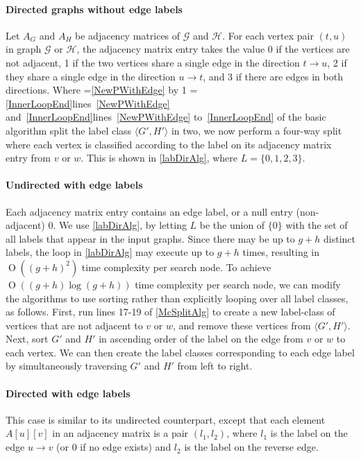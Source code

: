 \documentclass[letterpaper]{article}
\newcommand{\graphG}{\mathcal{G}}
\newcommand{\graphH}{\mathcal{H}}
\newcommand{\setG}{G}
\newcommand{\setH}{H}
\newcommand{\linerangeref}[2]{\count255=\ref{#1}\advance\count255 by 1 \ifnum\count255=\ref{#2}lines~\ref{#1} and~\ref{#2}\else lines~\ref{#1} to~\ref{#2}\fi}
\newcommand{\BigO}[1]{\ensuremath{\operatorname{O}\left(#1\right)}}
\begin{document}
\paragraph{Directed graphs without edge labels} Let $A_G$ and $A_H$ be
adjacency matrices of $\graphG$ and $\graphH$. For each vertex pair $(t,u)$ in graph $\graphG$ or
$\graphH$, the adjacency matrix entry takes the value 0 if the vertices are not
adjacent, 1 if the two vertices share a single edge in the direction $t
\rightarrow u$, 2 if they share a single edge in the direction $u \rightarrow
t$, and 3 if there are edges in both directions. Where
\linerangeref{NewPWithEdge}{InnerLoopEnd} of the basic algorithm split the
label class $\langle \setG',\setH' \rangle$ in two, we now perform a four-way split
where each vertex is classified according to the label on its adjacency matrix
entry from $v$ or $w$.  This is shown in \cref{labDirAlg}, where
$L=\{0,1,2,3\}$.

\paragraph{Undirected with edge labels} Each adjacency matrix entry contains an
edge label, or a null entry (non-adjacent) $0$.  We use \cref{labDirAlg}, by
letting $L$ be the union of $\{0\}$ with the set of all labels that appear in
the input graphs. Since there may be up to $g + h$ distinct labels, the loop in
\cref{labDirAlg} may execute up to $g + h$ times, resulting in $\BigO{(g+h)^2}$
time complexity per search node.  To achieve $\BigO{(g+h) \log (g+h)}$ time
complexity per search node, we can modify the algorithms to use sorting rather
than explicitly looping over all label classes, as follows.  First, run lines
17-19 of \cref{McSplitAlg} to create a new label-class of vertices that are
not adjacent to $v$ or $w$, and remove these vertices from $\langle \setG',\setH'
\rangle$.  Next, sort $\setG'$ and $\setH'$ in ascending order of the label on the edge
from $v$ or $w$ to each vertex. We can then create the label classes
corresponding to each edge label by simultaneously traversing $\setG'$ and $\setH'$
from left to right.

\paragraph{Directed with edge labels} This case is similar to its undirected
counterpart, except that each element $A[u][v]$ in an adjacency matrix is a
pair $(l_1, l_2)$, where $l_1$ is the label on the edge $u \rightarrow v$ (or 0
if no edge exists) and $l_2$ is the label on the reverse edge.
\end{document}
